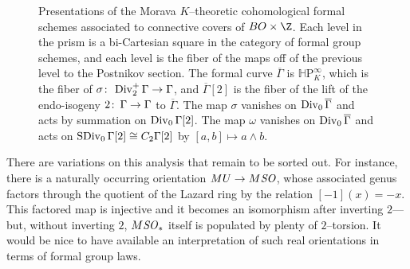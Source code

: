 \begin{figure}
\begin{center}
\end{center}
\caption{Presentations of the Morava \(K\)--theoretic cohomological formal schemes associated to connective covers of \(BO \times \Z\).
Each level in the prism is a bi-Cartesian square in the category of formal group schemes, and each level is the fiber of the maps off of the previous level to the Postnikov section.
The formal curve \(\overline \Gamma\) is \(\mathbb H\mathrm P^\infty_K\), which is the fiber of \(\sigma\colon\thinspace \operatorname{Div}_2^+ \Gamma \to \Gamma\), and \(\overline \Gamma[2]\) is the fiber of the lift of the endo-isogeny \(2\colon\thinspace \Gamma \to \Gamma\) to \(\overline \Gamma\).
The map \(\sigma\) vanishes on \(\operatorname{Div}_0 \overline \Gamma\) and acts by summation on \(\operatorname{Div}_0 \Gamma[2]\).
The map \(\omega\) vanishes on \(\operatorname{Div}_0 \overline \Gamma\) and acts on \(\operatorname{SDiv}_0 \Gamma[2] \cong C_2 \Gamma[2]\) by \([a, b] \mapsto a \wedge b\).}\label{MoravaKthyOfBO}
\end{figure}

\begin{remark}
There are variations on this analysis that remain to be sorted out.
For instance, there is a naturally occurring orientation \(MU \to M\mathit{SO}\), whose associated genus factors through the quotient of the Lazard ring by the relation \([-1](x) = -x\).
This factored map is injective and it becomes an isomorphism after inverting \(2\)---but, without inverting \(2\), \(M\mathit{SO}_*\) itself is populated by plenty of \(2\)--torsion.
It would be nice to have available an interpretation of such real orientations in terms of formal group laws.
\end{remark}

